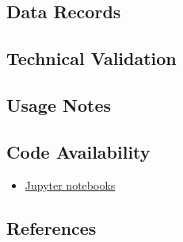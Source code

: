\hypertarget{data-records}{%
\subsection{Data Records}\label{data-records}}

\hypertarget{technical-validation}{%
\subsection{Technical Validation}\label{technical-validation}}

\hypertarget{usage-notes}{%
\subsection{Usage Notes}\label{usage-notes}}

\hypertarget{code-availability}{%
\subsection{Code Availability}\label{code-availability}}

\begin{itemize}
\tightlist
\item
  \href{https://github.unibe.ch/david-haberthuer/InMice}{Jupyter notebooks}
\end{itemize}

\hypertarget{references}{%
\subsection{References}\label{references}}

